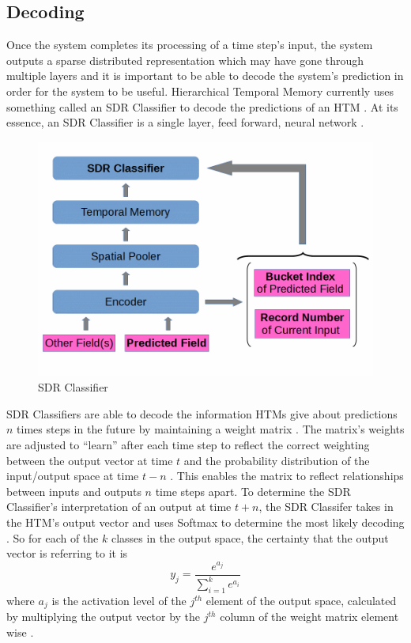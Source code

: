 \documentclass[fleqn,notitlepage,minimal]{article}
\begin{document}
	\subsection{Decoding}
	
	Once the system completes its processing of a time step's input, the system outputs a sparse distributed representation which may have gone through multiple layers and it is important to be able to decode the system's prediction in order for the system to be useful. Hierarchical Temporal Memory currently uses something called an SDR Classifier to decode the predictions of an HTM \cite{Dillon}. At its essence, an SDR Classifier is a single layer, feed forward, neural network \cite{Dillon}.
	
	\begin{figure}[h!]
		\centering
		\includegraphics[width=\linewidth]{images/SDRClassifier.jpg}
		\caption{SDR Classifier}
		\label{fig 3}
	\end{figure}
	
	SDR Classifiers are able to decode the information HTMs give about predictions $n$ times steps in the future by maintaining a weight matrix \cite{Dillon}. The matrix's weights are adjusted to ``learn'' after each time step to reflect the correct weighting between the output vector at time $t$ and the probability distribution of the input/output space at time $t-n$ \cite{Dillon}. This enables the matrix to reflect relationships between inputs and outputs $n$ time steps apart. To determine the SDR Classifier's interpretation of an output at time $t+n$, the SDR Classifer takes in the HTM's output vector and uses Softmax to determine the most likely decoding \cite{Dillon}. So for each of the $k$ classes in the output space, the certainty that the output vector is referring to it is $$y_{j} = \dfrac{e^{a_{j}}}{\sum_{i=1}^{k} e^{a_{i}}}$$ where $a_{j}$ is the activation level of the $j^{th}$ element of the output space, calculated by multiplying the output vector by the $j^{th}$ column of the weight matrix element wise \cite{Dillon}. 
	
\end{document}
